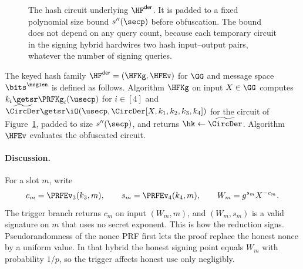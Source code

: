 \begin{figure}[t]
\begin{center}
\end{center}
\vspace{-6pt}
\caption{The hash circuit underlying $\HF^{\mathsf{der}}$. It is padded to a fixed polynomial size bound $s''(\secp)$ before obfuscation. The bound does not depend on any query count, because each temporary circuit in the signing hybrid hardwires two hash input--output pairs, whatever the number of signing queries.}\label{fig-circuit-derand}
\vspace{-3pt}\hrulefill
\vspace{-1ex}
\end{figure}

\begin{construction} \label{constr-der}
The keyed hash family $\HF^{\mathsf{der}} = (\HFKg,\HFEv)$ for $\GG$ and message space $\bits^{\msglen}$ is defined as follows. Algorithm $\HFKg$ on input $X\in\GG$ computes $k_i\getsr\PRFKg_i(\usecp)$ for $i\in[4]$ and $\widetilde{\CircDer}\getsr\iO(\usecp,\CircDer[X,k_1,k_2,k_3,k_4])$ for the circuit of Figure~\ref{fig-circuit-derand}, padded to size $s''(\secp)$, and returns $\hk\gets\widetilde{\CircDer}$. Algorithm $\HFEv$ evaluates the obfuscated circuit.
\end{construction}

\paragraph*{Discussion.} For a slot $m$, write
$$
c_m=\PRFEv_3(k_3,m),
\qquad
s_m=\PRFEv_4(k_4,m),
\qquad
W_m=g^{s_m}X^{-c_m}.
$$
The trigger branch returns $c_m$ on input $(W_m,m)$, and $(W_m,s_m)$ is a valid signature on $m$ that uses no secret exponent. This is how the reduction signs. Pseudorandomness of the nonce PRF first lets the proof replace the honest nonce by a uniform value. In that hybrid the honest signing point equals $W_m$ with probability $1/p$, so the trigger affects honest use only negligibly.

